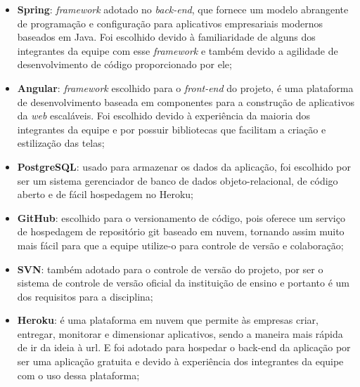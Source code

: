\documentclass[
    12pt,               %
    openright,          %
    oneside,
    a4paper,            %
    english,            %
    brazil              %
    ]{ifsp-spo-inf-ctds} %
\begin{document}
\begin{itemize}
\item{\textbf{Spring}}: \textit{\gls{framework}} adotado no \textit{\gls{back-end}}, que fornece um modelo abrangente de programação e configuração para aplicativos empresariais modernos baseados em Java. Foi escolhido devido à familiaridade de alguns dos integrantes da equipe com esse \textit{\gls{framework}} e também devido a agilidade de desenvolvimento de código proporcionado por ele;

\item{\textbf{Angular}}: \textit{\gls{framework}} escolhido para o \textit{\gls{front-end}} do projeto, é uma plataforma de desenvolvimento baseada em componentes para a construção de aplicativos da \textit{\gls{web}} escaláveis. Foi escolhido devido à experiência da maioria dos integrantes da equipe e por possuir bibliotecas que facilitam a criação e estilização das telas;

\item{\textbf{PostgreSQL}}: usado para armazenar os dados da aplicação, foi escolhido por ser um sistema gerenciador de banco de dados objeto-relacional, de código aberto e de fácil hospedagem no Heroku;

\item{\textbf{GitHub}}: escolhido para o versionamento de código, pois oferece um serviço de hospedagem de repositório \gls{git} baseado em nuvem, tornando assim muito mais fácil para que a equipe utilize-o para controle de versão e colaboração;


\item{\textbf{SVN}}: também adotado para o controle de versão do projeto, por ser o sistema de controle de versão oficial da instituição de ensino e portanto é um dos requisitos para a disciplina;

\item{\textbf{Heroku}}: é uma plataforma em nuvem que permite às empresas criar, entregar, monitorar e dimensionar aplicativos, sendo a maneira mais rápida de ir da ideia à \ac{url}. E foi adotado para hospedar o back-end da aplicação por ser uma aplicação gratuita e devido à experiência dos integrantes da equipe com o uso dessa plataforma;


\end{itemize}
\end{document}
